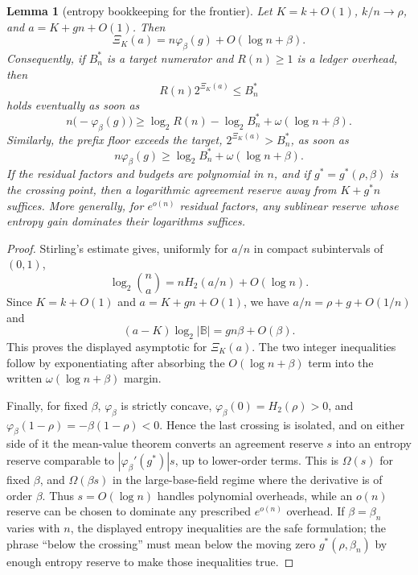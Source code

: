 \documentclass[a4paper,11pt]{amsart}
\newtheorem{lemma}[theorem]{Lemma}
\theoremstyle{remark}
\newcommand{\B}{\mathbb B}
\newcommand{\Htwo}{H_2}
\begin{document}
\begin{lemma}[entropy bookkeeping for the frontier]\label{lem:entropy-bookkeeping}
Let \(K=k+O(1)\), \(k/n\to\rho\), and \(a=K+gn+O(1)\).  Then
\[
        \Xi_K(a)=n\varphi_\beta(g)+O(\log n+\beta).
\]
Consequently, if \(B_n^*\) is a target numerator and \(R(n)\ge1\) is a ledger overhead, then
\[
        R(n)2^{\Xi_K(a)}\le B_n^*
\]
holds eventually as soon as
\[
        n\bigl(-\varphi_\beta(g)\bigr)
        \ge
        \log_2R(n)-\log_2B_n^*+\omega(\log n+\beta).
\]
Similarly, the prefix floor exceeds the target, \(2^{\Xi_K(a)}>B_n^*\), as soon as
\[
        n\varphi_\beta(g)
        \ge
        \log_2B_n^*+\omega(\log n+\beta).
\]
If the residual factors and budgets are polynomial in \(n\), and if \(g^*=g^*(\rho,\beta)\) is the crossing point, then a logarithmic agreement reserve away from \(K+g^*n\) suffices.  More generally, for \(e^{o(n)}\) residual factors, any sublinear reserve whose entropy gain dominates their logarithms suffices.
\end{lemma}

\begin{proof}
Stirling's estimate gives, uniformly for \(a/n\) in compact subintervals of \((0,1)\),
\[
        \log_2\binom na=n\Htwo(a/n)+O(\log n).
\]
Since \(K=k+O(1)\) and \(a=K+gn+O(1)\), we have \(a/n=\rho+g+O(1/n)\) and
\[
        (a-K)\log_2|\B|=gn\beta+O(\beta).
\]
This proves the displayed asymptotic for \(\Xi_K(a)\).  The two integer inequalities follow by exponentiating after absorbing the \(O(\log n+\beta)\) term into the written \(\omega(\log n+\beta)\) margin.

Finally, for fixed \(\beta\), \(\varphi_\beta\) is strictly concave, \(\varphi_\beta(0)=\Htwo(\rho)>0\), and \(\varphi_\beta(1-\rho)=-\beta(1-\rho)<0\).  Hence the last crossing is isolated, and on either side of it the mean-value theorem converts an agreement reserve \(s\) into an entropy reserve comparable to \(|\varphi_\beta'(g^*)|s\), up to lower-order terms.  This is \(\Omega(s)\) for fixed \(\beta\), and \(\Omega(\beta s)\) in the large-base-field regime where the derivative is of order \(\beta\).  Thus \(s=O(\log n)\) handles polynomial overheads, while an \(o(n)\) reserve can be chosen to dominate any prescribed \(e^{o(n)}\) overhead.  If \(\beta=\beta_n\) varies with \(n\), the displayed entropy inequalities are the safe formulation; the phrase ``below the crossing'' must mean below the moving zero \(g^*(\rho,\beta_n)\) by enough entropy reserve to make those inequalities true.
\end{proof}
\end{document}
